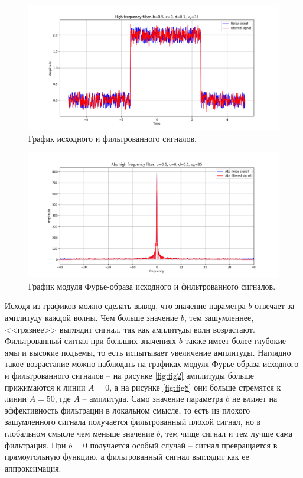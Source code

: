 \documentclass[a4paper, 12pt]{article}
\begin{document}
    \begin{figure}[!htb]
        \centering
        \includegraphics[scale=0.485]{9_u_flt_u_nohigh.png}
        \captionsetup{skip=0pt}
        \caption{График исходного и фильтрованного сигналов.}
        \label{fig:fig25}
    \end{figure}
    \begin{figure}[!htb]
        \centering
        \includegraphics[scale=0.485]{9_abs_u_U_nohigh.png}
        \captionsetup{skip=0pt}
        \caption{График модуля Фурье-образа исходного и фильтрованного сигналов.}
        \label{fig:fig26}
    \end{figure}


    Исходя из графиков можно сделать вывод, что значение параметра $b$ отвечает за амплитуду каждой волны.
    Чем больше значение $b$, тем зашумленнее, <<грязнее>> выглядит сигнал, так как амплитуды волн возрастают.
    Фильтрованный сигнал при больших значениях $b$ также имеет более глубокие ямы и высокие подъемы, то есть
    испытывает увеличение амплитуды. Наглядно такое возрастание можно наблюдать на графиках модуля Фурье-образа
    исходного и фильтрованного сигналов -- на рисунке \ref{fig:fig2} амплитуды больше прижимаются к линии 
    $A=0$, а на рисунке \ref{fig:fig8} они больше стремятся к линии $A=50$, где $A$ -- амплитуда. Само значение
    параметра $b$ не влияет на эффективность фильтрации в локальном смысле, то есть из плохого зашумленного сигнала
    получается фильтрованный плохой сигнал, но в глобальном смысле чем меньше значение $b$, тем чище сигнал и тем лучше
    сама фильтрация. При $b=0$ получается особый случай -- сигнал превращается в прямоугольную функцию, а фильтрованный
    сигнал выглядит как ее аппроксимация.
\end{document}
